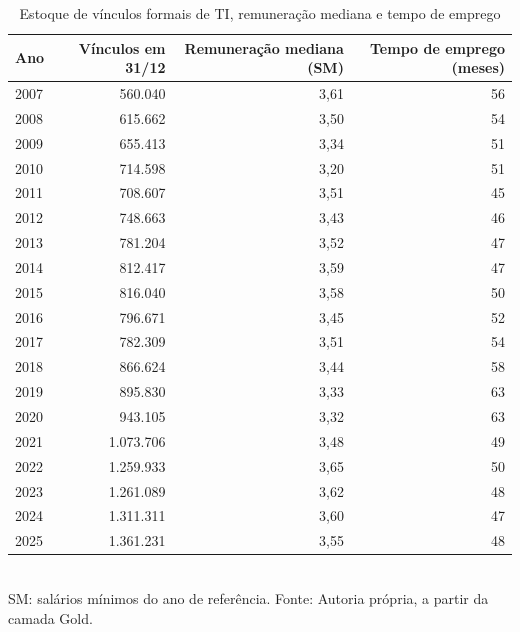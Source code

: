 \begin{table}[htbp]
    \centering
    \caption{Estoque de vínculos formais de TI, remuneração mediana e tempo de emprego}
    \label{tab:estoque-serie}
    \footnotesize
    \renewcommand{\arraystretch}{1.25}
    \begin{tabular}{lrrr}
        \toprule
        \rowcolor{black!8}
        \textbf{Ano} & \textbf{Vínculos em 31/12} & \textbf{Remuneração mediana (SM)} & \textbf{Tempo de emprego (meses)} \\
        \midrule
        2007 & 560.040 & 3,61 & 56 \\
        2008 & 615.662 & 3,50 & 54 \\
        2009 & 655.413 & 3,34 & 51 \\
        2010 & 714.598 & 3,20 & 51 \\
        2011 & 708.607 & 3,51 & 45 \\
        2012 & 748.663 & 3,43 & 46 \\
        2013 & 781.204 & 3,52 & 47 \\
        2014 & 812.417 & 3,59 & 47 \\
        2015 & 816.040 & 3,58 & 50 \\
        2016 & 796.671 & 3,45 & 52 \\
        2017 & 782.309 & 3,51 & 54 \\
        2018 & 866.624 & 3,44 & 58 \\
        2019 & 895.830 & 3,33 & 63 \\
        2020 & 943.105 & 3,32 & 63 \\
        2021 & 1.073.706 & 3,48 & 49 \\
        2022 & 1.259.933 & 3,65 & 50 \\
        2023 & 1.261.089 & 3,62 & 48 \\
        2024 & 1.311.311 & 3,60 & 47 \\
        2025 & 1.361.231 & 3,55 & 48 \\
        \bottomrule
    \end{tabular}
    \\[4pt]
    SM: salários mínimos do ano de referência. Fonte: Autoria própria, a partir da camada Gold.
\end{table}
